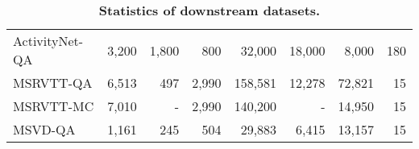 \documentclass[10pt,twocolumn,letterpaper]{article}
\begin{document}
\begin{table*}[tp]
{\begin{tabular}{lrrrrrrr}
        ActivityNet-QA \cite{anet_qa} & 3,200 & 1,800 & 800 & 32,000 & 18,000 & 8,000 & 180 \\
        MSRVTT-QA \cite{msrvtt_qa} & 6,513 & 497 & 2,990 & 158,581 & 12,278 & 72,821 & 15 \\
        MSRVTT-MC \cite{msrvtt_mc} & 7,010 & - & 2,990 & 140,200 & - & 14,950 & 15 \\
        MSVD-QA \cite{msrvtt_qa} & 1,161 & 245 & 504 & 29,883 & 6,415 & 13,157 & 15  \\
        \bottomrule
        \end{tabular}
    }
    \vspace{-0.3cm}
    \caption{\textbf{Statistics of downstream datasets.}
    }
    \label{tab:statics_downstream}
    \vspace{-0.1cm}
\end{table*}
  
\end{document}
